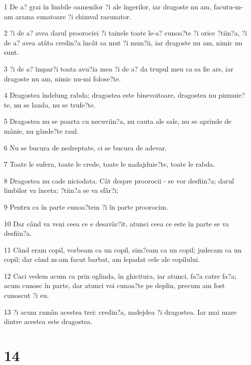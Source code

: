 \par 1 De a? grai în limbile oamenilor ?i ale îngerilor, iar dragoste nu am, facutu-m-am arama sunatoare ?i chimval rasunator.
\par 2 ?i de a? avea darul proorociei ?i tainele toate le-a? cunoa?te ?i orice ?tiin?a, ?i de a? avea atâta credin?a încât sa mut ?i mun?ii, iar dragoste nu am, nimic nu sunt.
\par 3 ?i de a? împar?i toata avu?ia mea ?i de a? da trupul meu ca sa fie ars, iar dragoste nu am, nimic nu-mi folose?te.
\par 4 Dragostea îndelung rabda; dragostea este binevoitoare, dragostea nu pizmuie?te, nu se lauda, nu se trufe?te.
\par 5 Dragostea nu se poarta cu necuviin?a, nu cauta ale sale, nu se aprinde de mânie, nu gânde?te raul.
\par 6 Nu se bucura de nedreptate, ci se bucura de adevar.
\par 7 Toate le sufera, toate le crede, toate le nadajduie?te, toate le rabda.
\par 8 Dragostea nu cade niciodata. Cât despre proorocii - se vor desfiin?a; darul limbilor va înceta; ?tiin?a se va sfâr?i;
\par 9 Pentru ca în parte cunoa?tem ?i în parte proorocim.
\par 10 Dar când va veni ceea ce e desavâr?it, atunci ceea ce este în parte se va desfiin?a.
\par 11 Când eram copil, vorbeam ca un copil, sim?eam ca un copil; judecam ca un copil; dar când m-am facut barbat, am lepadat cele ale copilului.
\par 12 Caci vedem acum ca prin oglinda, în ghicitura, iar atunci, fa?a catre fa?a; acum cunosc în parte, dar atunci voi cunoa?te pe deplin, precum am fost cunoscut ?i eu.
\par 13 ?i acum ramân acestea trei: credin?a, nadejdea ?i dragostea. Iar mai mare dintre acestea este dragostea.

\chapter{14}

